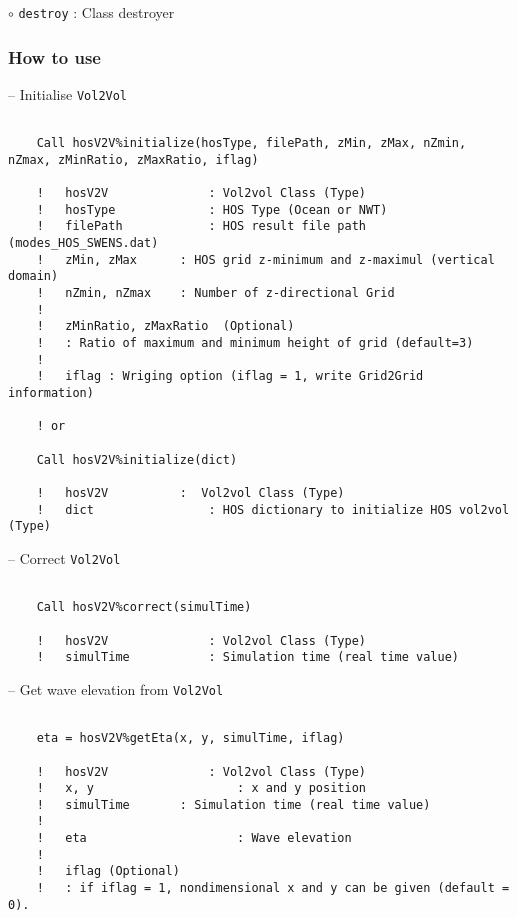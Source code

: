 	\hspace{1.0 cm} $\circ$ \texttt{destroy} : Class destroyer\\    
	
	\pagebreak
	
	\subsubsection{How to use}
	
	\hspace{0.5 cm} -- Initialise \texttt{Vol2Vol}
	
	\begin{lstlisting}[language={[95]Fortran}]
	
	Call hosV2V%initialize(hosType, filePath, zMin, zMax, nZmin, nZmax, zMinRatio, zMaxRatio, iflag)
	
	!	hosV2V				: Vol2vol Class (Type)
	!	hosType				: HOS Type (Ocean or NWT)
	!	filePath			: HOS result file path (modes_HOS_SWENS.dat)
	!	zMin, zMax 		: HOS grid z-minimum and z-maximul (vertical domain)
	!	nZmin, nZmax 	: Number of z-directional Grid	
	!
	!	zMinRatio, zMaxRatio  (Optional)
	!	: Ratio of maximum and minimum height of grid (default=3)
	!
	!	iflag : Wriging option (iflag = 1, write Grid2Grid information)
	
	! or 
	
	Call hosV2V%initialize(dict)
	
	!	hosV2V			:  Vol2vol Class (Type)
	!	dict				: HOS dictionary to initialize HOS vol2vol (Type)
	\end{lstlisting}
	
	\hspace{0.5 cm} -- Correct \texttt{Vol2Vol}
	
	\begin{lstlisting}[language={[95]Fortran}]
	
	Call hosV2V%correct(simulTime)
	
	!	hosV2V				: Vol2vol Class (Type)
	!	simulTime			: Simulation time (real time value)
	\end{lstlisting}	
	
	\hspace{0.5 cm} -- Get wave elevation from \texttt{Vol2Vol}
	
	\begin{lstlisting}[language={[95]Fortran}]
	
	eta = hosV2V%getEta(x, y, simulTime, iflag)
	
	!	hosV2V				: Vol2vol Class (Type)
	!	x, y					: x and y position 
	!	simulTime 		: Simulation time (real time value)
	!
	!	eta						: Wave elevation
	!
	!	iflag (Optional)	
	!	: if iflag = 1, nondimensional x and y can be given (default = 0). 	
	\end{lstlisting}		
	
